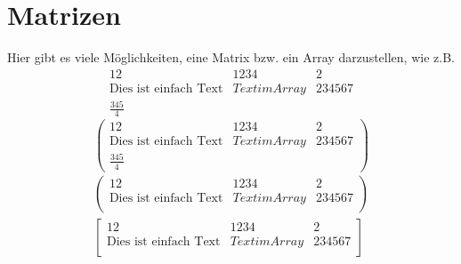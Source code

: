 \section{Matrizen}

Hier gibt es viele Möglichkeiten, eine Matrix bzw. ein Array darzustellen, wie z.B.
\begin{equation}
	\begin{array}{lrc}
	12 & 1234 & 2 \\
	\mbox{Dies ist einfach Text} & Text im Array & 234567 \\
	\frac{345}{4}
	\end{array}
\end{equation}
\begin{equation}
	\left(
	\begin{array}{lrc}
	12 & 1234 & 2 \\
	\mbox{Dies ist einfach Text} & Text im Array & 234567 \\
	\displaystyle \frac{345}{4}
	\end{array}
	\right)
\end{equation}
\begin{eqnarray}
	\begin{pmatrix}
	12 & 1234 & 2 \\
	\mbox{Dies ist einfach Text} & Text im Array & 234567 \\	
	\end{pmatrix}
	\\ %
	\begin{bmatrix}
	12 & 1234 & 2 \\
	\mbox{Dies ist einfach Text} & Text im Array & 234567 \\	
	\end{bmatrix}
\end{eqnarray}
